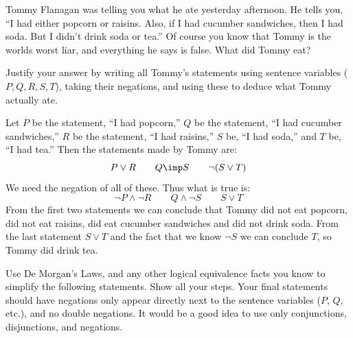 \begin{questions}
  \question[4] Tommy Flanagan was telling you what he ate yesterday afternoon.  He tells you, ``I had either popcorn or raisins.  Also, if I had cucumber sandwiches, then I had soda.  But I didn't drink soda or tea.''  Of course you know that Tommy is the worlds worst liar, and everything he says is false.  What did Tommy eat?

  Justify your answer by writing all Tommy's statements using sentence variables ($P, Q, R, S, T$), taking their negations, and using these to deduce what Tommy actually ate.

  \begin{solution}
  Let $P$ be the statement, ``I had popcorn,'' $Q$ be the statement, ``I had cucumber sandwiches,'' $R$ be the statement, ``I had raisins,'' $S$ be, ``I had soda,'' and $T$ be, ``I had tea.''  Then the statements made by Tommy are:
  \[P \vee R \qquad Q \imp S \qquad \neg(S \vee T)\]
  We need the negation of all of these.  Thus what is true is:
  \[\neg P \wedge \neg R \qquad Q \wedge \neg S \qquad S \vee T\]
  From the first two statements we can conclude that Tommy did not eat popcorn, did not eat raisins, did eat cucumber sandwiches and did not drink soda.  From the last statement $S \vee T$ and the fact that we know $\neg S$ we can conclude $T$, so Tommy did drink tea.
  \end{solution}





  \question[8] Use De Morgan's Laws, and any other logical equivalence facts you know to simplify the following statements.  Show all your steps.  Your final statements should have negations only appear directly next to the sentence variables ($P$, $Q$, etc.), and no double negations.  It would be a good idea to use only conjunctions, disjunctions, and negations.
\end{questions}
